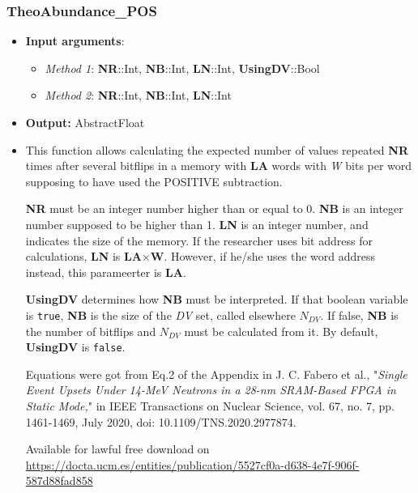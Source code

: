 \subsubsection*{TheoAbundance\_POS}\label{Subsec:TheoAbundance_POS}
%
\begin{itemize}
	\item \textbf{Input arguments}:
	\begin{itemize}
		\item \textit{Method 1}: \textbf{NR}::Int, \textbf{NB}::Int, \textbf{LN}::Int, \textbf{UsingDV}::Bool
		\item \textit{Method 2}: \textbf{NR}::Int, \textbf{NB}::Int, \textbf{LN}::Int
	\end{itemize}
	\item \textbf{Output:} AbstractFloat
	\item This function allows calculating the expected number of values repeated 	 \textbf{NR} times after several bitflips in a memory with \textbf{LA} words with \textit{W} bits per word   	supposing to have used the POSITIVE subtraction.
	
	\textbf{NR} must be an integer number higher than or equal to 0. 
	\textbf{NB} is an integer number supposed to be higher than 1.
	\textbf{LN} is an integer number, and indicates the size of the memory. If the researcher uses bit address for calculations, \textbf{LN} is \textbf{LA}\(\times\)\textbf{W}. However, if he/she uses the word address instead, this parameerter is \textbf{LA}.
	
	\textbf{UsingDV} determines how \textbf{NB} must be interpreted. If that boolean variable is \texttt{true}, \textbf{NB} is the size of the \textit{DV} set, called elsewhere \(N_{DV}\). If false, \textbf{NB} is the number of bitflips and \(N_{DV}\) must be calculated from it. By default, \textbf{UsingDV} is \texttt{false}.
	
	Equations were got from Eq.2 of the Appendix in J. C. Fabero et al., "\textit{Single Event Upsets Under 14-MeV Neutrons in a 28-nm
		SRAM-Based FPGA in Static Mode,}" in IEEE Transactions on Nuclear Science, vol.
	67, no. 7, pp. 1461-1469, July 2020, doi: 10.1109/TNS.2020.2977874.
	
	Available for lawful free download on \href{https://docta.ucm.es/entities/publication/5527cf0a-d638-4e7f-906f-587d88fad858}{https://docta.ucm.es/entities/publication/5527cf0a-d638-4e7f-906f-587d88fad858}
\end{itemize}

